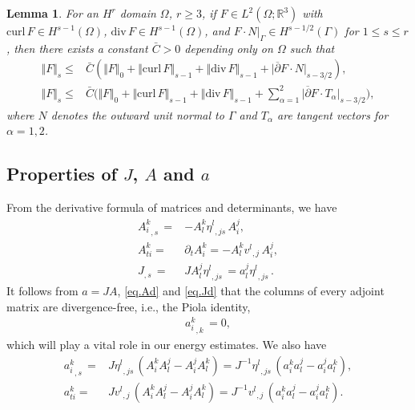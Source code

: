 \documentclass[12pt,twoside,reqno]{amsart}
\numberwithin{equation}{section}
\newtheorem{lemma}[theorem]{Lemma}
\theoremstyle{definition}
\theoremstyle{remark}
\begin{document}
\begin{lemma}\label{lem.Hodge}
  For an $H^r$ domain $\Omega$, $r{\geqslant} 3$, if $F\in L^2(\Omega;{\mathbb R}^3)$ with ${\mathrm{curl}\,} F\in H^{s-1}(\Omega)$, ${\mathrm{div}\,} F\in H^{s-1}(\Omega)$, and $F\cdot N|_{\Gamma}\in H^{s-1/2}({\Gamma})$ for $1{\leqslant} s{\leqslant} r$, then there exists a constant $\bar{C}>0$ depending only on $\Omega$ such that
  \begin{align*}
      {\Vert{F}\Vert}_s{\leqslant} &\bar{C}\left({\Vert{F}\Vert}_0+{\Vert{{\mathrm{curl}\,} F}\Vert}_{s-1}+{\Vert{{\mathrm{div}\,} F}\Vert}_{s-1}+{\vert{{\overline{\partial}} F\cdot N}\vert}_{s-3/2}\right),\\
      {\Vert{F}\Vert}_s{\leqslant} &\bar{C}\Big({\Vert{F}\Vert}_0+{\Vert{{\mathrm{curl}\,} F}\Vert}_{s-1}+{\Vert{{\mathrm{div}\,} F}\Vert}_{s-1}+\sum_{\alpha=1}^2{\vert{{\overline{\partial}} F\cdot T_\alpha}\vert}_{s-3/2}\Big),
  \end{align*}
  where $N$ denotes the outward unit normal to ${\Gamma}$ and $T_\alpha$ are tangent vectors for $\alpha=1,2$.
\end{lemma}

\subsection{Properties of $J$, $A$ and $a$}\label{sec.4}

From the derivative formula of matrices and determinants, we have
\begin{align}
  {{{A_i^k}}_{,{s}}\,}=&-A_l^k{{{\eta^l}}_{,{js}}\,}A_i^j,\label{eq.Ad}\\
  A^k_{ti}=&{\partial}_tA^k_i=-A^k_l{{{v^l}}_{,{j}}\,}A^j_i,\label{eq.At}\\
  {{{J}}_{,{s}}\,}=&JA_l^j{{{\eta^l}}_{,{js}}\,}=a_l^j{{{\eta^l}}_{,{js}}\,}.\label{eq.Jd}
\end{align}
It follows from $a=JA$, \eqref{eq.Ad} and \eqref{eq.Jd} that the columns of every adjoint matrix are divergence-free, i.e., the Piola identity,
\begin{align}\label{eq.Piola}
  {{{a_i^k}}_{,{k}}\,}=0,
\end{align}
which will play a vital role in our energy estimates. We also have
\begin{align}
  {{{a_i^k}}_{,{s}}\,}=&J{{{\eta^l}}_{,{js}}\,}(A_i^kA_l^j-A_i^jA_l^k) =J^{-1}{{{\eta^l}}_{,{js}}\,}(a_i^ka_l^j-a_i^ja_l^k),\label{eq.ahd}\\
  a_{ti}^k=&J {{{v^l}}_{,{j}}\,}(A_i^kA_l^j-A_i^jA_l^k) =J^{-1}{{{v^l}}_{,{j}}\,}(a_i^ka_l^j-a_i^ja_l^k).\label{eq.adt}
\end{align}
\end{document}
